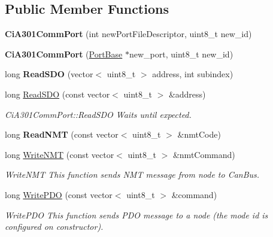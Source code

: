 \subsection*{Public Member Functions}
\begin{DoxyCompactItemize}
\item 
\mbox{\label{classCiA301CommPort_aae705cb5c6a405ef74a10e5220d0b08f}} 
{\bfseries Ci\+A301\+Comm\+Port} (int new\+Port\+File\+Descriptor, uint8\+\_\+t new\+\_\+id)
\item 
\mbox{\label{classCiA301CommPort_a1e05c4b292cfee36ff9eeddb2c8eb4c0}} 
{\bfseries Ci\+A301\+Comm\+Port} (\hyperlink{classPortBase}{Port\+Base} $\ast$new\+\_\+port, uint8\+\_\+t new\+\_\+id)
\item 
\mbox{\label{classCiA301CommPort_a0fd0920052684589bc37bb898dcdd758}} 
long {\bfseries Read\+S\+DO} (vector$<$ uint8\+\_\+t $>$ address, int subindex)
\item 
long \hyperlink{classCiA301CommPort_a3f74ce5899b30731322dabd352ccdc55}{Read\+S\+DO} (const vector$<$ uint8\+\_\+t $>$ \&address)
\begin{DoxyCompactList}\small\item\em Ci\+A301\+Comm\+Port\+::\+Read\+S\+DO Waits until expected. \end{DoxyCompactList}\item 
\mbox{\label{classCiA301CommPort_a02df85ed5140d0d7a57fe0d2f6e47ea1}} 
long {\bfseries Read\+N\+MT} (const vector$<$ uint8\+\_\+t $>$ \&nmt\+Code)
\item 
long \hyperlink{classCiA301CommPort_a09feb3f78831c9fbb683a85cc3bc4562}{Write\+N\+MT} (const vector$<$ uint8\+\_\+t $>$ \&nmt\+Command)
\begin{DoxyCompactList}\small\item\em Write\+N\+MT This function sends N\+MT message from node to Can\+Bus. \end{DoxyCompactList}\item 
long \hyperlink{classCiA301CommPort_a56d2c604b11363e6b287f59b68a546bd}{Write\+P\+DO} (const vector$<$ uint8\+\_\+t $>$ \&command)
\begin{DoxyCompactList}\small\item\em Write\+P\+DO This function sends P\+DO message to a node (the mode id is configured on constructor). \end{DoxyCompactList}\item 

\end{DoxyCompactItemize}
